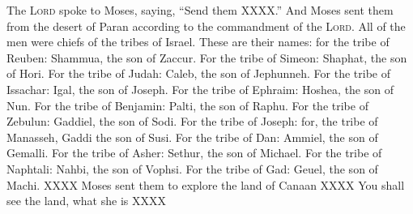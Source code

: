 
\begin{inparaenum}
     The \textsc{Lord} spoke to Moses, saying,%
     ``Send them XXXX.''%
     And Moses sent them from the desert of Paran according to the commandment of the \textsc{Lord}. All of the men were chiefs of the tribes of Israel.%
     These are their names: for the tribe of Reuben: Shammua, the son of Zaccur.%
     For the tribe of Simeon: Shaphat, the son of Hori.%
     For the tribe of Judah: Caleb, the son of Jephunneh.%
     For the tribe of Issachar: Igal, the son of Joseph.%
     For the tribe of Ephraim: Hoshea, the son of Nun.%
     For the tribe of Benjamin: Palti, the son of Raphu.%
     For the tribe of Zebulun: Gaddiel, the son of Sodi.%
     For the tribe of Joseph: for, the tribe of Manasseh, Gaddi the son of Susi.%
     For the tribe of Dan: Ammiel, the son of Gemalli.%
     For the tribe of Asher: Sethur, the son of Michael.%
     For the tribe of Naphtali: Nahbi, the son of Vophsi.%
     For the tribe of Gad: Geuel, the son of Machi.%
     XXXX%
     Moses sent them to explore the land of Canaan XXXX%
     You shall see the land, what she is XXXX%
\end{inparaenum}
